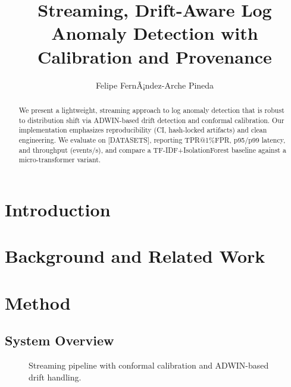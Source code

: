 \documentclass[10pt,twocolumn]{article}
\title{Streaming, Drift-Aware Log Anomaly Detection with Calibration and Provenance}
\author{Felipe FernÃ¡ndez-Arche Pineda}
\date{} %
\begin{document}
\maketitle

\begin{abstract}
We present a lightweight, streaming approach to log anomaly detection that is
robust to distribution shift via ADWIN-based drift detection and conformal
calibration. Our implementation emphasizes reproducibility (CI, hash-locked
artifacts) and clean engineering. We evaluate on [DATASETS], reporting
TPR@1\%FPR, p95/p99 latency, and throughput (events/s), and compare a
TF-IDF+IsolationForest baseline against a micro-transformer variant.
\end{abstract}

\section{Introduction}

\section{Background and Related Work}

\section{Method}
\subsection{System Overview}
\begin{figure}[t]
  \centering
  \caption{Streaming pipeline with conformal calibration and ADWIN-based drift handling.}
  \label{fig:pipeline}
\end{figure}
\end{document}
